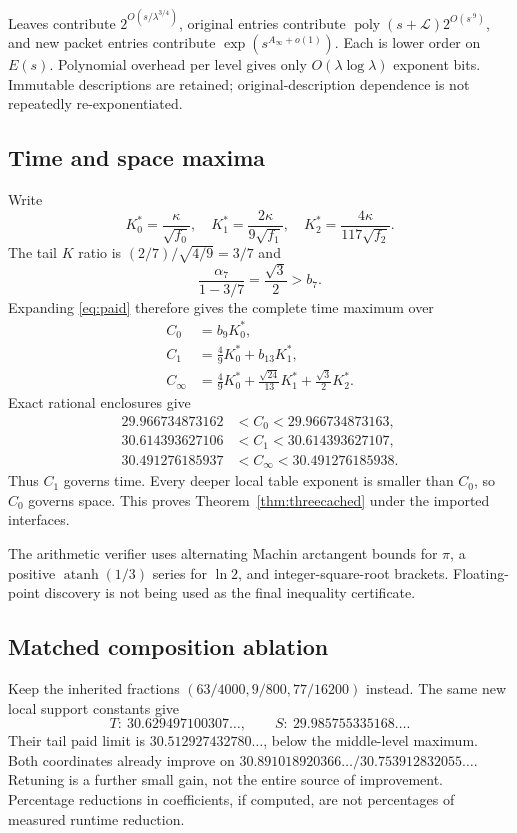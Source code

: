 \documentclass[11pt,letterpaper]{article}
\theoremstyle{remark}\newtheorem{remark}[theorem]{Remark}
\newcommand{\poly}{\operatorname{poly}}\newcommand{\vTwo}{v_2}\newcommand{\ceil}[1]{\left\lceil#1\right\rceil}\newcommand{\floor}[1]{\left\lfloor#1\right\rfloor}\newcommand{\LL}{\mathcal L}
\begin{document}
Leaves contribute $2^{O(s/\lambda^{3/4})}$, original entries contribute $\poly(s+\LL)2^{O(s^{.9})}$, and new packet entries contribute $\exp(s^{A_\infty+o(1)})$. Each is lower order on $E(s)$. Polynomial overhead per level gives only $O(\lambda\log\lambda)$ exponent bits. Immutable descriptions are retained; original-description dependence is not repeatedly re-exponentiated.

\subsection{Time and space maxima}
Write
\[
 K_0^*=\frac\kappa{\sqrt{f_0}},\quad
 K_1^*=\frac{2\kappa}{9\sqrt{f_1}},\quad
 K_2^*=\frac{4\kappa}{117\sqrt{f_2}}.
\]
The tail $K$ ratio is $(2/7)/\sqrt{4/9}=3/7$ and
\[
 \frac{\alpha_7}{1-3/7}=\frac{\sqrt3}{2}>b_7.
\]
Expanding \eqref{eq:paid} therefore gives the complete time maximum over
\begin{align}
 C_0&=b_9K_0^*,\label{eq:c0}\\
 C_1&=\frac49K_0^*+b_{13}K_1^*,\label{eq:c1}\\
 C_\infty&=\frac49K_0^*+\frac{\sqrt{24}}{13}K_1^*
                           +\frac{\sqrt3}{2}K_2^*.\label{eq:ci}
\end{align}
Exact rational enclosures give
\begin{align*}
 29.966734873162&<C_0<29.966734873163,\\
 30.614393627106&<C_1<30.614393627107,\\
 30.491276185937&<C_\infty<30.491276185938.
\end{align*}
Thus $C_1$ governs time. Every deeper local table exponent is smaller than $C_0$, so $C_0$ governs space. This proves Theorem~\ref{thm:threecached} under the imported interfaces.

The arithmetic verifier uses alternating Machin arctangent bounds for $\pi$, a positive $\operatorname{atanh}(1/3)$ series for $\ln2$, and integer-square-root brackets. Floating-point discovery is not being used as the final inequality certificate.

\subsection{Matched composition ablation}
Keep the inherited fractions $(63/4000,9/800,77/16200)$ instead. The same new local support constants give
\[
 T:\ 30.629497100307\ldots,\qquad
 S:\ 29.985755335168\ldots.
\]
Their tail paid limit is $30.512927432780\ldots$, below the middle-level maximum. Both coordinates already improve on $30.891018920366\ldots/30.753912832055\ldots$. Retuning is a further small gain, not the entire source of improvement. Percentage reductions in coefficients, if computed, are not percentages of measured runtime reduction.
\end{document}

